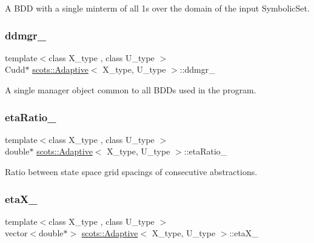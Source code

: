 A B\+DD with a single minterm of all 1s over the domain of the input Symbolic\+Set. \mbox{\label{classscots_1_1Adaptive_a9e6666734880dba708dd931348041274}} 
\subsubsection{\texorpdfstring{ddmgr\+\_\+}{ddmgr\_}}
{\footnotesize\ttfamily template$<$class X\+\_\+type , class U\+\_\+type $>$ \\
Cudd$\ast$ \hyperlink{classscots_1_1Adaptive}{scots\+::\+Adaptive}$<$ X\+\_\+type, U\+\_\+type $>$\+::ddmgr\+\_\+}

A single manager object common to all B\+D\+Ds used in the program. \mbox{\label{classscots_1_1Adaptive_af0ae9692bf76a9d38cca670e9535310f}} 
\subsubsection{\texorpdfstring{eta\+Ratio\+\_\+}{etaRatio\_}}
{\footnotesize\ttfamily template$<$class X\+\_\+type , class U\+\_\+type $>$ \\
double$\ast$ \hyperlink{classscots_1_1Adaptive}{scots\+::\+Adaptive}$<$ X\+\_\+type, U\+\_\+type $>$\+::eta\+Ratio\+\_\+}

Ratio between state space grid spacings of consecutive abstractions. \mbox{\label{classscots_1_1Adaptive_abe9d5faea4bd01753070599200e224c5}} 
\subsubsection{\texorpdfstring{eta\+X\+\_\+}{etaX\_}}
{\footnotesize\ttfamily template$<$class X\+\_\+type , class U\+\_\+type $>$ \\
vector$<$double$\ast$$>$ \hyperlink{classscots_1_1Adaptive}{scots\+::\+Adaptive}$<$ X\+\_\+type, U\+\_\+type $>$\+::eta\+X\+\_\+}

